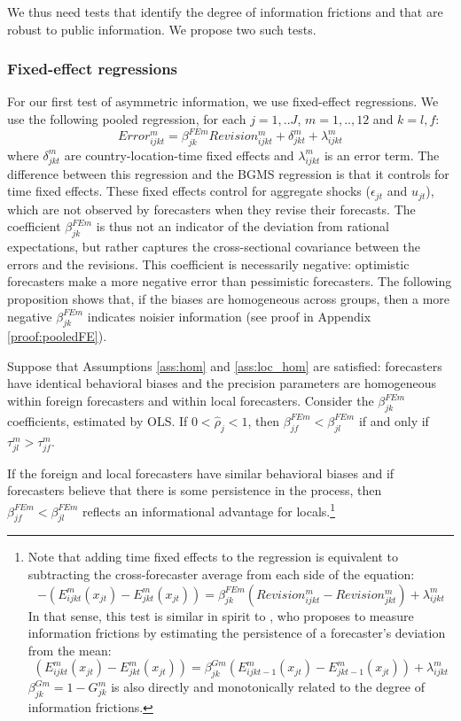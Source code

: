We thus need tests that identify the degree of information frictions and that are robust to public information. We propose two such tests.

\subsubsection{Fixed-effect regressions}

For our first test of asymmetric information, we use fixed-effect regressions. We use the following pooled regression, for each $j=1,..J$, $m=1,..,12$ and $k=l,f$:
\begin{equation}Error_{ijkt}^m=\beta^{FEm}_{jk}Revision_{ijkt}^m+\delta_{jkt}^m+\lambda_{ijkt}^m\label{eq:pooledFE}
\end{equation}
where $\delta_{jkt}^m$ are country-location-time fixed effects and $\lambda_{ijkt}^m$ is an error term. The difference between this regression and the BGMS regression is that it controls for time fixed effects. These fixed effects control for aggregate shocks ($\epsilon_{jt}$ and $u_{jt}$), which are not observed by forecasters when they revise their forecasts. The coefficient $\beta^{FEm}_{jk}$ is thus not an indicator of the deviation from rational expectations, but rather captures the cross-sectional covariance between the errors and the revisions. This coefficient is necessarily negative: optimistic forecasters make a more negative error than pessimistic forecasters. The following proposition shows that, if the biases are homogeneous across groups, then a more negative $\beta^{FEm}_{jk}$ indicates noisier information (see proof in Appendix \ref{proof:pooledFE}).
\begin{prop}\label{prop:pooledFE} Suppose that Assumptions \ref{ass:hom} and \ref{ass:loc_hom} are satisfied: forecasters have identical behavioral biases and the precision parameters are homogeneous within foreign forecasters and within local forecasters.
Consider the $\beta^{FEm}_{jk}$ coefficients, estimated by OLS. If $0<\hat\rho_j<1$, then $\beta^{FEm}_{jf}<\beta^{FEm}_{jl}$ if and only if $\tau_{jl}^m>\tau_{jf}^m$.
\end{prop}
If the foreign and local forecasters have similar behavioral biases and if forecasters believe that there is some persistence in the process, then $\beta^{FEm}_{jf}<\beta^{FEm}_{jl}$ reflects an informational advantage for locals.\footnote{Note that adding time fixed effects to the regression is equivalent to subtracting the cross-forecaster average from each side of the equation:
$$-\left(E_{ijkt}^m(x_{jt})-E_{jkt}^m(x_{jt})\right)=\beta^{FEm}_{jk}(Revision_{ijkt}^m-Revision_{jkt}^m)+\lambda_{ijkt}^m$$
In that sense, this test is similar in spirit to \citet{Goldstein2021}, who proposes to measure information frictions by estimating the persistence of a forecaster's deviation from the mean:
$$\left(E_{ijkt}^m(x_{jt})-E_{jkt}^m(x_{jt})\right)=\beta^{Gm}_{jk}\left(E_{ijkt-1}^m(x_{jt})-E_{jkt-1}^m(x_{jt})\right)+\lambda_{ijkt}^m$$
$\beta^{Gm}_{jk}=1-G^{m}_{jk}$ is also directly and monotonically related to the degree of information frictions.}



